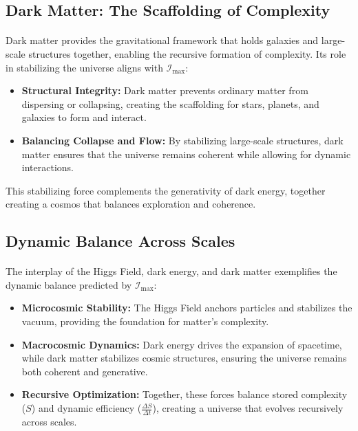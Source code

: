 \documentclass[12pt]{article}
\begin{document}
\subsection{Dark Matter: The Scaffolding of Complexity}
\paragraph{}
Dark matter provides the gravitational framework that holds galaxies and large-scale structures together, enabling the recursive formation of complexity. Its role in stabilizing the universe aligns with \(\mathcal{I}_{\text{max}}\):
\begin{itemize}
    \item \textbf{Structural Integrity:} Dark matter prevents ordinary matter from dispersing or collapsing, creating the scaffolding for stars, planets, and galaxies to form and interact.
    \item \textbf{Balancing Collapse and Flow:} By stabilizing large-scale structures, dark matter ensures that the universe remains coherent while allowing for dynamic interactions.
\end{itemize}
This stabilizing force complements the generativity of dark energy, together creating a cosmos that balances exploration and coherence.

\subsection{Dynamic Balance Across Scales}
\paragraph{}
The interplay of the Higgs Field, dark energy, and dark matter exemplifies the dynamic balance predicted by \(\mathcal{I}_{\text{max}}\):
\begin{itemize}
    \item \textbf{Microcosmic Stability:} The Higgs Field anchors particles and stabilizes the vacuum, providing the foundation for matter’s complexity.
    \item \textbf{Macrocosmic Dynamics:} Dark energy drives the expansion of spacetime, while dark matter stabilizes cosmic structures, ensuring the universe remains both coherent and generative.
    \item \textbf{Recursive Optimization:} Together, these forces balance stored complexity (\(S\)) and dynamic efficiency (\(\frac{\Delta S}{\Delta t}\)), creating a universe that evolves recursively across scales.
\end{itemize}
\end{document}
